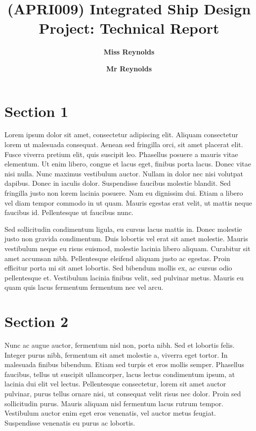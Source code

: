 \documentclass[onecolumn,superscriptaddress,11pt,aps]{revtex4}
\begin{document}

\title{\Large{(APRI009) Integrated Ship Design Project: Technical Report}}
\vspace{1cm}
\author{\small{\bf Miss Reynolds}}
\author{\small{\bf Mr Reynolds}}

\maketitle


\section{Section 1}

Lorem ipsum dolor sit amet, consectetur adipiscing elit. Aliquam consectetur lorem ut malesuada consequat. Aenean sed fringilla orci, sit amet placerat elit. Fusce viverra pretium elit, quis suscipit leo. Phasellus posuere a mauris vitae elementum. Ut enim libero, congue et lacus eget, finibus porta lacus. Donec vitae nisi nulla. Nunc maximus vestibulum auctor. Nullam in dolor nec nisi volutpat dapibus. Donec in iaculis dolor. Suspendisse faucibus molestie blandit. Sed fringilla justo non lorem lacinia posuere. Nam eu dignissim dui. Etiam a libero vel diam tempor commodo in ut quam. Mauris egestas erat velit, ut mattis neque faucibus id. Pellentesque ut faucibus nunc.

Sed sollicitudin condimentum ligula, eu cursus lacus mattis in. Donec molestie justo non gravida condimentum. Duis lobortis vel erat sit amet molestie. Mauris vestibulum neque eu risus euismod, molestie lacinia libero aliquam. Curabitur sit amet accumsan nibh. Pellentesque eleifend aliquam justo ac egestas. Proin efficitur porta mi sit amet lobortis. Sed bibendum mollis ex, ac cursus odio pellentesque et. Vestibulum lacinia finibus velit, sed pulvinar metus. Mauris eu quam quis lacus fermentum fermentum nec vel arcu.

\section{Section 2}

Nunc ac augue auctor, fermentum nisl non, porta nibh. Sed et lobortis felis. Integer purus nibh, fermentum sit amet molestie a, viverra eget tortor. In malesuada finibus bibendum. Etiam sed turpis et eros mollis semper. Phasellus faucibus, tellus ut suscipit ullamcorper, lacus lectus condimentum ipsum, at lacinia dui elit vel lectus. Pellentesque consectetur, lorem sit amet auctor pulvinar, purus tellus ornare nisi, ut consequat velit risus nec dolor. Proin sed sollicitudin purus. Mauris aliquam nisl fermentum lacus rutrum tempor. Vestibulum auctor enim eget eros venenatis, vel auctor metus feugiat. Suspendisse venenatis eu purus ac lobortis.
\end{document}
